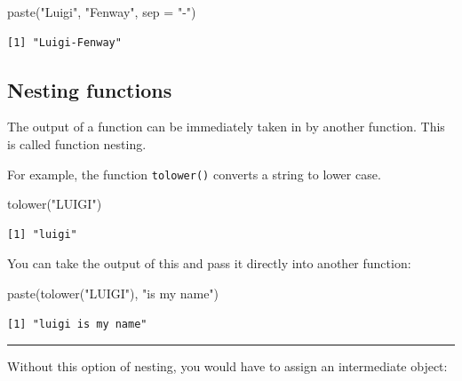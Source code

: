 \documentclass[
  letterpaper,
  DIV=11,
  numbers=noendperiod]{scrreprt}
\newenvironment{Shaded}{\begin{snugshade}}{\end{snugshade}}
\newcommand{\AttributeTok}[1]{\textcolor[rgb]{0.40,0.45,0.13}{#1}}
\newcommand{\FunctionTok}[1]{\textcolor[rgb]{0.28,0.35,0.67}{#1}}
\newcommand{\NormalTok}[1]{\textcolor[rgb]{0.00,0.23,0.31}{#1}}
\newcommand{\StringTok}[1]{\textcolor[rgb]{0.13,0.47,0.30}{#1}}
\begin{document}
\begin{Shaded}
\begin{Highlighting}[]
\FunctionTok{paste}\NormalTok{(}\StringTok{"Luigi"}\NormalTok{, }\StringTok{"Fenway"}\NormalTok{, }\AttributeTok{sep =} \StringTok{"{-}"}\NormalTok{)}
\end{Highlighting}
\end{Shaded}

\begin{verbatim}
[1] "Luigi-Fenway"
\end{verbatim}

\subsection{Nesting functions}\label{nesting-functions}

The output of a function can be immediately taken in by another
function. This is called function nesting.

For example, the function \texttt{tolower()} converts a string to lower
case.

\begin{Shaded}
\begin{Highlighting}[]
\FunctionTok{tolower}\NormalTok{(}\StringTok{"LUIGI"}\NormalTok{)}
\end{Highlighting}
\end{Shaded}

\begin{verbatim}
[1] "luigi"
\end{verbatim}

You can take the output of this and pass it directly into another
function:

\begin{Shaded}
\begin{Highlighting}[]
\FunctionTok{paste}\NormalTok{(}\FunctionTok{tolower}\NormalTok{(}\StringTok{"LUIGI"}\NormalTok{), }\StringTok{"is my name"}\NormalTok{)}
\end{Highlighting}
\end{Shaded}

\begin{verbatim}
[1] "luigi is my name"
\end{verbatim}

\begin{center}\rule{0.5\linewidth}{0.5pt}\end{center}

Without this option of nesting, you would have to assign an intermediate
object:
\end{document}
